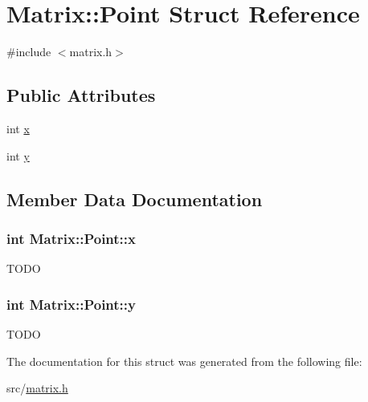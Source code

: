 \hypertarget{structMatrix_1_1Point}{
\section{Matrix::Point Struct Reference}
\label{structMatrix_1_1Point}
}


{\ttfamily \#include $<$matrix.h$>$}

\subsection*{Public Attributes}
\begin{DoxyCompactItemize}
\item 
int \hyperlink{structMatrix_1_1Point_a2b232ad12860c70ec725e7ddb3034a1e}{x}
\item 
int \hyperlink{structMatrix_1_1Point_aefcca947f63a8ed4d5de75b5e3ffd322}{y}
\end{DoxyCompactItemize}


\subsection{Member Data Documentation}
\hypertarget{structMatrix_1_1Point_a2b232ad12860c70ec725e7ddb3034a1e}{
\subsubsection[{x}]{\setlength{\rightskip}{0pt plus 5cm}int {\bf Matrix::Point::x}}}
\label{structMatrix_1_1Point_a2b232ad12860c70ec725e7ddb3034a1e}
TODO \hypertarget{structMatrix_1_1Point_aefcca947f63a8ed4d5de75b5e3ffd322}{
\subsubsection[{y}]{\setlength{\rightskip}{0pt plus 5cm}int {\bf Matrix::Point::y}}}
\label{structMatrix_1_1Point_aefcca947f63a8ed4d5de75b5e3ffd322}
TODO 

The documentation for this struct was generated from the following file:\begin{DoxyCompactItemize}
\item 
src/\hyperlink{matrix_8h}{matrix.h}\end{DoxyCompactItemize}
